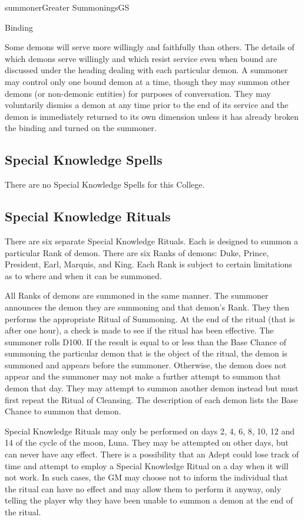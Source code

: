 \begin{college}[1.0]{summoner}{Greater Summonings}{GS}
\begin{ritual}[Q-6]{Binding}
\begin{effects}
Some demons will serve more willingly and faithfully than others.  The
details of which demons serve willingly and which resist service even
when bound are discussed under the heading dealing with each
particular demon.  A summoner may control only one bound demon at a
time, though they may summon other demons (or non-demonic entities)
for purposes of conversation.  They may voluntarily dismiss a demon at
any time prior to the end of its service and the demon is immediately
returned to its own dimension unless it has already broken the binding
and turned on the summoner.
\end{effects}
\end{ritual}

\subsection{Special Knowledge Spells}

There are no Special Knowledge Spells for this College.

\subsection{Special Knowledge Rituals}
\label{greater.summonings:special.rituals}

There are six separate Special Knowledge Rituals.  Each is designed to
summon a particular Rank of demon.  There are six Ranks of demons:
Duke, Prince, President, Earl, Marquis, and King.  Each Rank is
subject to certain limitations as to where and when it can be
summoned.

All Ranks of demons are summoned in the same manner.  The summoner
announces the demon they are summoning and that demon's Rank.  They
then performs the appropriate Ritual of Summoning.  At the end of the
ritual (that is after one hour), a check is made to see if the ritual
has been effective.  The summoner rolls D100.  If the result is equal
to or less than the Base Chance of summoning the particular demon that
is the object of the ritual, the demon is summoned and appears before
the summoner.  Otherwise, the demon does not appear and the summoner
may not make a further attempt to summon that demon that day.  They
may attempt to summon another demon instead but must first repeat the
Ritual of Cleansing.  The description of each demon lists the Base
Chance to summon that demon.

Special Knowledge Rituals may only be performed on days 2, 4, 6, 8,
10, 12 and 14 of the cycle of the moon, Luna.  They may be attempted
on other days, but can never have any effect. There is a possibility
that an Adept could lose track of time and attempt to employ a Special
Knowledge Ritual on a day when it will not work.  In such cases, the
GM may choose not to inform the individual that the ritual can have no
effect and may allow them to perform it anyway, only telling the
player why they have been unable to summon a demon at the end of the
ritual.


\end{college}

